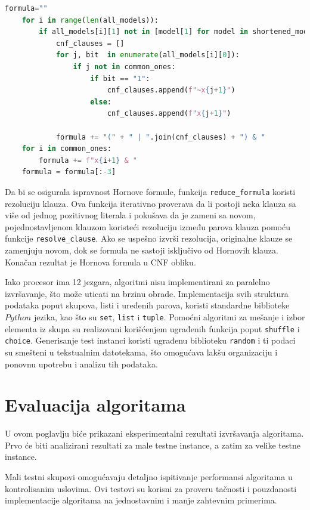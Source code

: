 \documentclass[12pt,oneside]{memoir}
\begin{document}
\begin{lstlisting}[language=Python]
formula=""
    for i in range(len(all_models)):
        if all_models[i][1] not in [model[1] for model in shortened_models]:
            cnf_clauses = []
            for j, bit  in enumerate(all_models[i][0]):
                if j not in common_ones:
                    if bit == "1":
                        cnf_clauses.append(f"~x{j+1}")
                    else:
                        cnf_clauses.append(f"x{j+1}")

            formula += "(" + " | ".join(cnf_clauses) + ") & "   
    for i in common_ones:
        formula += f"x{i+1} & "
    formula = formula[:-3]
\end{lstlisting}
\vspace{0.5cm}

Da bi se osigurala ispravnost Hornove formule, funkcija \texttt{reduce\_formula} koristi rezoluciju klauza. Ova funkcija iterativno proverava da li postoji neka klauza sa više od jednog pozitivnog literala i pokušava da je zameni sa novom, pojednostavljenom klauzom koristeći rezoluciju između parova klauza pomoću funkcije \texttt{resolve\_clause}. Ako se uspešno izvrši rezolucija, originalne klauze se zamenjuju novom, dok se formula ne sastoji isključivo od Hornovih klauza. Konačan rezultat je Hornova formula u CNF obliku.

Iako procesor ima 12 jezgara, algoritmi nisu implementirani za paralelno izvršavanje, što može uticati na brzinu obrade. Implementacija svih struktura podataka poput skupova, listi i uređenih parova, koristi standardne biblioteke $Python$ jezika, kao što su \texttt{set}, \texttt{list} i \texttt{tuple}. Pomoćni algoritmi za mešanje i izbor elementa iz skupa su realizovani korišćenjem ugrađenih funkcija poput \texttt{shuffle} i \texttt{choice}. Generisanje test instanci koristi ugrađenu biblioteku \texttt{random} i ti podaci su smešteni u tekstualnim datotekama, što omogućava lakšu organizaciju i ponovnu upotrebu i analizu tih podataka.

\chapter{Evaluacija algoritama}
U ovom poglavlju biće prikazani eksperimentalni rezultati izvršavanja algoritama. Prvo će biti analizirani rezultati za male testne instance, a zatim za velike testne instance.

Mali testni skupovi omogućavaju detaljno ispitivanje performansi algoritama u kontrolisanim uslovima. Ovi testovi su korisni za proveru tačnosti i pouzdanosti implementacije algoritama na jednostavnim i manje zahtevnim primerima. 
\end{document}
